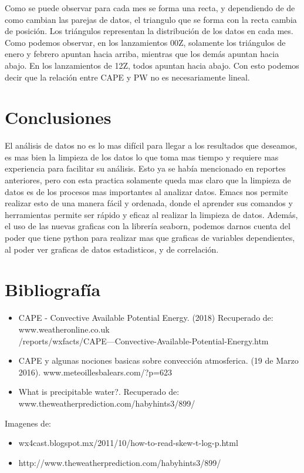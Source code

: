 \documentclass[12pt]{article}
\begin{document}
Como se puede observar para cada mes se forma una recta, y dependiendo de de como cambian las parejas de datos, el triangulo que se forma con la recta cambia de posición. Los triángulos representan la distribución de los datos en cada mes. Como podemos observar, en los lanzamientos 00Z, solamente los triángulos de enero y febrero apuntan hacia arriba, mientras que los demás apuntan hacia abajo. En los lanzamientos de 12Z, todos apuntan hacia abajo. Con esto podemos decir que la relación entre CAPE y PW no es necesariamente lineal. 

\section{Conclusiones}
El análisis de datos no es lo mas difícil para llegar a los resultados que deseamos, es mas bien la limpieza de los datos lo que toma mas tiempo y requiere mas experiencia para facilitar su análisis. Esto ya se había mencionado en reportes anteriores, pero con esta practica solamente queda mas claro que la limpieza de datos es de los procesos mas importantes al analizar datos. Emacs nos permite realizar esto de una manera fácil y ordenada, donde el aprender sus comandos y herramientas permite ser rápido y eficaz al realizar la limpieza de datos. Además, el uso de las nuevas graficas con la librería seaborn, podemos darnos cuenta del poder que tiene python para realizar mas que graficas de variables dependientes, al poder ver graficas de datos estadisticos, y de correlación. 

\section{Bibliografía}
\begin{itemize}
    \item CAPE - Convective Available Potential Energy. (2018) Recuperado de: www.weatheronline.co.uk \\ /reports/wxfacts/CAPE---Convective-Available-Potential-Energy.htm
    \item CAPE y algunas nociones basicas sobre convección atmosferica. (19 de Marzo 2016). www.meteoillesbalears.com/?p=623
    \item What is precipitable water?. Recuperado de: www.theweatherprediction.com/habyhints3/899/
\end{itemize}

Imagenes de:
\begin{itemize}
\item wx4cast.blogspot.mx/2011/10/how-to-read-skew-t-log-p.html
\item http://www.theweatherprediction.com/habyhints3/899/
\end{itemize}
\end{document}
